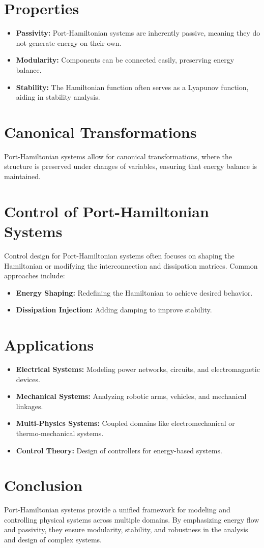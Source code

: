 \section{Properties}
\begin{itemize}
    \item \textbf{Passivity:} Port-Hamiltonian systems are inherently passive, meaning they do not generate energy on their own.
    \item \textbf{Modularity:} Components can be connected easily, preserving energy balance.
    \item \textbf{Stability:} The Hamiltonian function often serves as a Lyapunov function, aiding in stability analysis.
\end{itemize}

\section{Canonical Transformations}
Port-Hamiltonian systems allow for canonical transformations, where the structure is preserved under changes of variables, ensuring that energy balance is maintained.

\section*{Control of Port-Hamiltonian Systems}
Control design for Port-Hamiltonian systems often focuses on shaping the Hamiltonian or modifying the interconnection and dissipation matrices. Common approaches include:
\begin{itemize}
    \item \textbf{Energy Shaping:} Redefining the Hamiltonian to achieve desired behavior.
    \item \textbf{Dissipation Injection:} Adding damping to improve stability.
\end{itemize}

\section{Applications}
\begin{itemize}
    \item \textbf{Electrical Systems:} Modeling power networks, circuits, and electromagnetic devices.
    \item \textbf{Mechanical Systems:} Analyzing robotic arms, vehicles, and mechanical linkages.
    \item \textbf{Multi-Physics Systems:} Coupled domains like electromechanical or thermo-mechanical systems.
    \item \textbf{Control Theory:} Design of controllers for energy-based systems.
\end{itemize}

\section{Conclusion}
Port-Hamiltonian systems provide a unified framework for modeling and controlling physical systems across multiple domains. By emphasizing energy flow and passivity, they ensure modularity, stability, and robustness in the analysis and design of complex systems.

